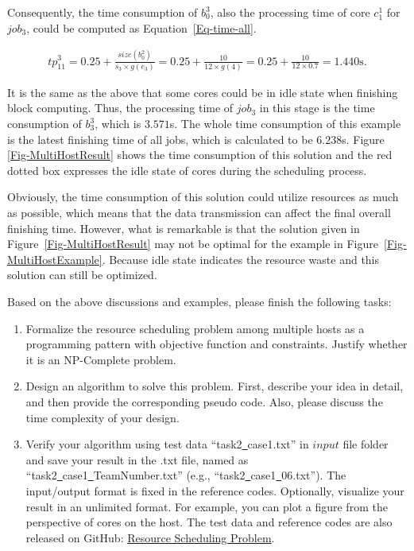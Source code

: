 \documentclass{llncs}
\begin{document}
Consequently, the time consumption of $b^3_0$, also the processing time of core $c^1_1$ for $job_3$, could be computed as Equation~\eqref{Eq-time-all}.

\begin{equation}
\begin{aligned}
{tp}^3_{11}=0.25+\frac{size(b^2_0)}{s_3\times{g(e_3)}}=0.25+\frac{10}{12\times{g(4)}}=0.25+\frac{10}{12\times0.7}=1.440\text{s}.
\label{Eq-time-all}
\end{aligned}
\end{equation}

It is the same as the above that some cores could be in idle state when finishing block computing. Thus, the processing time of $job_3$ in this stage is the time consumption of $b^3_3$, which is $3.571$s. The whole time consumption of this example is the latest finishing time of all jobs, which is calculated to be $6.238$s. Figure \ref{Fig-MultiHostResult} shows the time consumption of this solution and the red dotted box expresses the idle state of cores during the scheduling process.

Obviously, the time consumption of this solution could utilize resources as much as possible, which means that the data transmission can affect the final overall finishing time. However, what is remarkable is that the solution given in Figure~\ref{Fig-MultiHostResult} may not be optimal for the example in Figure~\ref{Fig-MultiHostExample}. Because idle state indicates the resource waste and this solution can still be optimized.

\vspace{2mm}
Based on the above discussions and examples, please finish the following tasks:
\begin{enumerate}
  \vspace{-1mm}
  \item Formalize the resource scheduling problem among multiple hosts as a programming pattern with objective function and constraints. Justify whether it is an NP-Complete problem.
  \item Design an algorithm to solve this problem. First, describe your idea in detail, and then provide the corresponding pseudo code. Also, please discuss the time complexity of your design.
  \item Verify your algorithm using test data ``task2\underline\ case1.txt'' in $input$ file folder and save your result in the .txt file, named as ``task2\underline\ case1\underline\ TeamNumber.txt'' (e.g., ``task2\underline\ case1\underline\ 06.txt''). The input/output format is fixed in the reference codes. Optionally, visualize your result in an unlimited format. For example, you can plot a figure from the perspective of cores on the host. The test data and reference codes are also released on GitHub: \href{https://github.com/shiwanghua/SharedFiles/tree/Project-CodeDemo}{Resource Scheduling Problem}. 
\end{enumerate}
\end{document}
